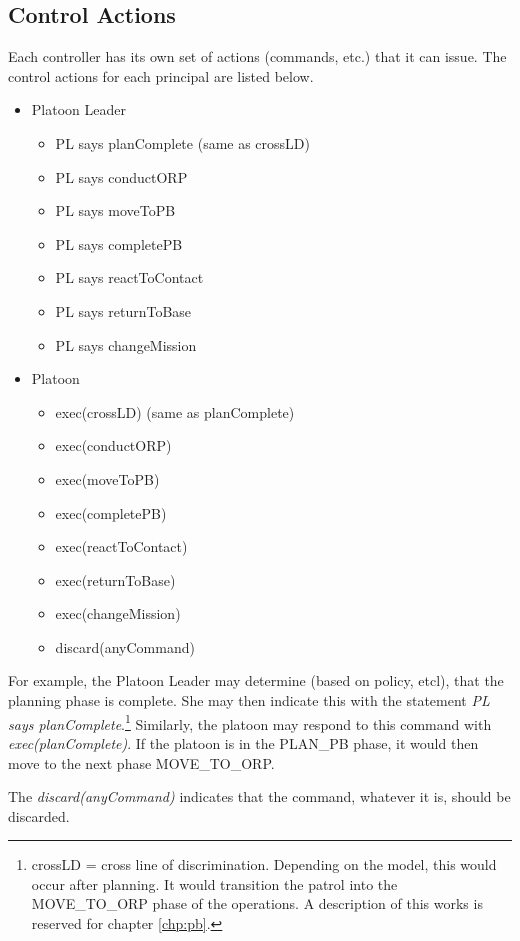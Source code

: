 \documentclass[../../main/main.tex]{subfiles}
\begin{document}
\subsection{Control Actions}
Each controller has its own set of actions (commands, etc.) that it can issue.  The control actions for each principal are listed below.  
\begin{itemize}
\item Platoon Leader
\begin{itemize}
\item PL says planComplete (same as crossLD)
\item PL says conductORP
\item PL says moveToPB
\item PL says completePB
\item PL says reactToContact
\item PL says returnToBase
\item PL says changeMission
\end{itemize}
\item Platoon
\begin{itemize}
\item exec(crossLD) (same as planComplete)
\item exec(conductORP)
\item exec(moveToPB)
\item exec(completePB)
\item exec(reactToContact)
\item exec(returnToBase)
\item exec(changeMission)
\item discard(anyCommand)
\end{itemize}

\end{itemize}

For example, the Platoon Leader may determine (based on policy, etcl), that the planning phase is complete.  She may then indicate this with the statement \textit{PL says planComplete}.\footnote{crossLD = cross line of discrimination.  Depending on the model, this would occur after planning.  It would transition the patrol into the MOVE_TO_ORP phase of the operations.  A description of this works is reserved for chapter \ref{chp:pb}.} Similarly, the platoon may respond to this command with \textit{exec(planComplete)}.  If the platoon is in the PLAN_PB phase, it would then move to the next phase MOVE_TO_ORP.

The \textit{discard(anyCommand)} indicates that the command, whatever it is, should be discarded. 
\end{document}
